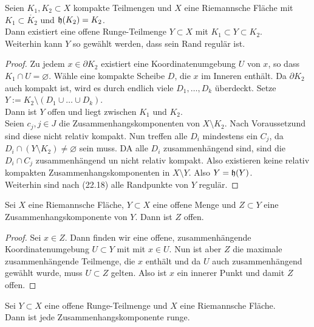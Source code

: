 \begin{lemma}
  \label{lemma:zwischen-runge}
  Seien $K_1, K_2 \subset X$ kompakte Teilmengen und $X$ eine
  Riemannsche Fläche mit $K_1 \subset \mathring{K_2}$ und $\mathfrak{h}(K_2)
  = K_2$. \\
  Dann existiert eine offene Runge-Teilmenge $Y \subset X$ mit $K_1
  \subset Y \subset K_2$. \\
  Weiterhin kann $Y$ so gewählt werden, dass sein Rand regulär ist.
\end{lemma}

\begin{proof}
  Zu jedem $x \in \partial K_2$ existiert eine Koordinatenumgebung $U$
  von $x$, so dass $K_1 \cap U = \varnothing$. Wähle eine kompakte
  Scheibe $D$, die $x$ im Inneren enthält. Da $\partial K_2$ auch
  kompakt ist, wird es durch endlich viele $D_1, \dots, D_k$
  überdeckt. Setze $Y := K_2 \setminus (D_1 \cup \dots \cup D_k)$. \\
  Dann ist $Y$ offen und liegt zwischen $K_1$ und $K_2$. \\
  Seien $c_j, j \in J$ die Zusammenhangskomponenten von $X \setminus
  K_2$. Nach Voraussetzund sind diese nicht relativ kompakt. Nun
  treffen alle $D_i$ mindestens ein $C_j$, da $D_i \cap (Y \setminus
  K_2) \neq \varnothing$ sein muss. DA alle $D_i$ zusammenhängend
  sind, sind die $D_i \cap C_j$ zusammenhängend un nicht relativ
  kompakt. Also existieren keine relativ kompakten
  Zusammenhangskomponenten in $X\setminus Y$. Also $Y = \mathfrak{h}(Y)$. \\
  Weiterhin sind nach (22.18) alle Randpunkte von $Y$ regulär.
\end{proof}

\begin{lemma}
  \label{lemma:zsh-komp}
  Sei $X$ eine Riemannsche Fläche, $Y \subset X$ eine offene Menge und
  $Z \subset Y$ eine Zusammenhangskomponente von $Y$. Dann ist $Z$ offen.
\end{lemma}

\begin{proof}
  Sei $x \in Z$. Dann finden wir eine offene, zusammenhängende
  Koordinatenumgebung $U \subset Y$ mit mit $x \in U$. Nun ist aber
  $Z$ die maximale zusammenhängende Teilmenge, die $x$ enthält und da
  $U$ auch zusammenhängend gewählt wurde, muss $U \subset Z$
  gelten. Also ist $x$ ein innerer Punkt und damit $Z$ offen.
\end{proof}

\begin{thm}
  \label{thm:runge-zshkomp}
  Sei $Y \subset X$ eine offene Runge-Teilmenge und $X$ eine
  Riemannsche Fläche. \\
  Dann ist jede Zusammenhangskomponente runge.
\end{thm}

